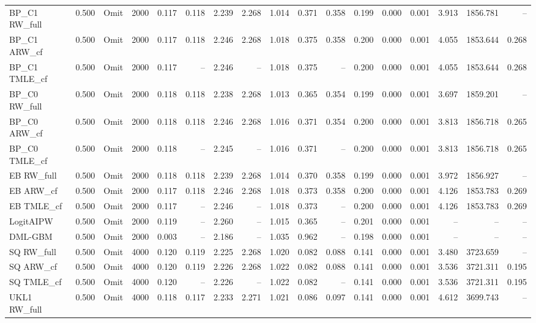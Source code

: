 \begin{tabular}{llllrrrrrrrrrrrrr}
BP\_C1 RW\_full & 0.500 & Omit & 2000 & 0.117 & 0.118 & 2.239 & 2.268 & 1.014 & 0.371 & 0.358 & 0.199 & 0.000 & 0.001 & 3.913 & 1856.781 & -- \\
BP\_C1 ARW\_cf & 0.500 & Omit & 2000 & 0.117 & 0.118 & 2.246 & 2.268 & 1.018 & 0.375 & 0.358 & 0.200 & 0.000 & 0.001 & 4.055 & 1853.644 & 0.268 \\
BP\_C1 TMLE\_cf & 0.500 & Omit & 2000 & 0.117 & -- & 2.246 & -- & 1.018 & 0.375 & -- & 0.200 & 0.000 & 0.001 & 4.055 & 1853.644 & 0.268 \\
BP\_C0 RW\_full & 0.500 & Omit & 2000 & 0.118 & 0.118 & 2.238 & 2.268 & 1.013 & 0.365 & 0.354 & 0.199 & 0.000 & 0.001 & 3.697 & 1859.201 & -- \\
BP\_C0 ARW\_cf & 0.500 & Omit & 2000 & 0.118 & 0.118 & 2.246 & 2.268 & 1.016 & 0.371 & 0.354 & 0.200 & 0.000 & 0.001 & 3.813 & 1856.718 & 0.265 \\
BP\_C0 TMLE\_cf & 0.500 & Omit & 2000 & 0.118 & -- & 2.245 & -- & 1.016 & 0.371 & -- & 0.200 & 0.000 & 0.001 & 3.813 & 1856.718 & 0.265 \\
EB RW\_full & 0.500 & Omit & 2000 & 0.118 & 0.118 & 2.239 & 2.268 & 1.014 & 0.370 & 0.358 & 0.199 & 0.000 & 0.001 & 3.972 & 1856.927 & -- \\
EB ARW\_cf & 0.500 & Omit & 2000 & 0.117 & 0.118 & 2.246 & 2.268 & 1.018 & 0.373 & 0.358 & 0.200 & 0.000 & 0.001 & 4.126 & 1853.783 & 0.269 \\
EB TMLE\_cf & 0.500 & Omit & 2000 & 0.117 & -- & 2.246 & -- & 1.018 & 0.373 & -- & 0.200 & 0.000 & 0.001 & 4.126 & 1853.783 & 0.269 \\
LogitAIPW & 0.500 & Omit & 2000 & 0.119 & -- & 2.260 & -- & 1.015 & 0.365 & -- & 0.201 & 0.000 & 0.001 & -- & -- & -- \\
DML-GBM & 0.500 & Omit & 2000 & 0.003 & -- & 2.186 & -- & 1.035 & 0.962 & -- & 0.198 & 0.000 & 0.001 & -- & -- & -- \\
SQ RW\_full & 0.500 & Omit & 4000 & 0.120 & 0.119 & 2.225 & 2.268 & 1.020 & 0.082 & 0.088 & 0.141 & 0.000 & 0.001 & 3.480 & 3723.659 & -- \\
SQ ARW\_cf & 0.500 & Omit & 4000 & 0.120 & 0.119 & 2.226 & 2.268 & 1.022 & 0.082 & 0.088 & 0.141 & 0.000 & 0.001 & 3.536 & 3721.311 & 0.195 \\
SQ TMLE\_cf & 0.500 & Omit & 4000 & 0.120 & -- & 2.226 & -- & 1.022 & 0.082 & -- & 0.141 & 0.000 & 0.001 & 3.536 & 3721.311 & 0.195 \\
UKL1 RW\_full & 0.500 & Omit & 4000 & 0.118 & 0.117 & 2.233 & 2.271 & 1.021 & 0.086 & 0.097 & 0.141 & 0.000 & 0.001 & 4.612 & 3699.743 & -- \\

\end{tabular}
